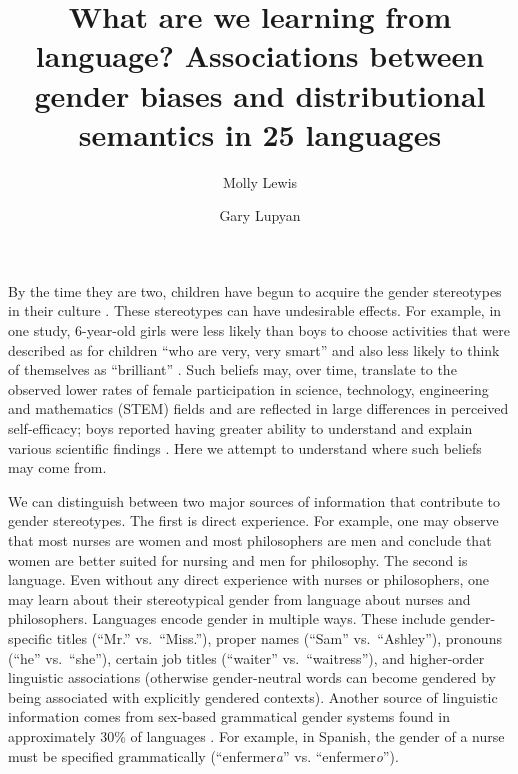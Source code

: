 \documentclass[9pt,twocolumn,twoside,lineno]{pnas-new}
\title{What are we learning from language? Associations between gender biases
and distributional semantics in 25 languages}
\author[a,b,1]{Molly Lewis}
\author[b,1,2]{Gary Lupyan}
\affil[a]{University of Chicago}
\affil[b]{University of Wisconsin-Madison}
\begin{document}
\maketitle
\thispagestyle{firststyle}

By the time they are two, children  have begun to acquire the
gender stereotypes in their culture \cite{gelman2004mother}. These
stereotypes can have undesirable effects. For example, in one study,
6-year-old girls were less likely than boys to choose activities that
were described as for children \enquote{who are very, very smart} and
also less likely to think of themselves as \enquote{brilliant}  \cite{bian2017gender}. Such beliefs may, over time, translate to the observed lower rates of female participation in science, technology, engineering and mathematics (STEM) fields \cite{ceci2011understanding,leslie2015expectations,miller2015women,stoet2018gender} and are reflected in large differences in perceived self-efficacy; boys reported having greater ability to understand and explain various scientific findings  \citep[independent of actual ability,][]{stoet2018gender}.  Here we attempt to understand where such beliefs may come from.

We can distinguish between two major sources of information that contribute to gender stereotypes. The first is direct experience. For
example, one may observe that most nurses are women and most
philosophers are men and conclude that women are better suited for
nursing and men for philosophy. The second is language. Even without any
direct experience with nurses or philosophers, one may learn about their
stereotypical gender from language about nurses and philosophers.
Languages encode gender in multiple ways. These include gender-specific
titles (\enquote{Mr.} vs.\ \enquote{Miss.}), proper names (\enquote{Sam}
vs.\ \enquote{Ashley}), pronouns (\enquote{he} vs.\ \enquote{she}),
certain job titles (\enquote{waiter} vs.\ \enquote{waitress}), and
higher-order linguistic associations (otherwise gender-neutral words can
become gendered by being associated with explicitly gendered contexts).
Another source of linguistic information comes from sex-based
grammatical gender systems found in approximately 30\% of languages \cite{wals}. For example, in Spanish, the gender of a
nurse must be specified grammatically (\enquote{enfermer\emph{a}} vs.
\enquote{enfermer\emph{o}}).
\end{document}
